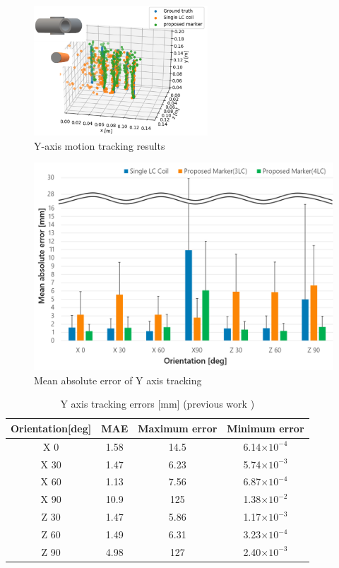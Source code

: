 \documentclass[journal,twoside,web]{ieeecolor}
\begin{document}
\begin{figure}[t]
\begin{minipage}{0.5\hsize}
\begin{center}
   \centerline{\includegraphics[width=65mm]{figure/yaxis-z90_2.png}}
  \end{center}
 \end{minipage}
 \caption{Y-axis motion tracking results}
 \label{y-axis-tracking}
\end{figure}
 
 \begin{figure}[t]
    \centerline{\includegraphics[width=\columnwidth]{figure/yaxis_error2.png}}
    \caption{Mean absolute error of Y axis tracking}
    \label{y-axis-ave_error}
\end{figure}

 \begin{table}[t]
  \begin{center}
  \caption{Y axis tracking errors [mm] (previous work \cite{im3d+})}
  \label{y-axis-error_1LC}
  \begin{tabular}{c||c|c|c} \hline
    Orientation[deg] & MAE & Maximum error & Minimum error\\ \hline\hline
    X 0 & 1.58 & 14.5 & 6.14$\times10^{-4}$ \\
    X 30 & 1.47 & 6.23 & 5.74$\times10^{-3}$ \\
    X 60 & 1.13 & 7.56 & 6.87$\times10^{-4}$ \\
    X 90 & 10.9 & 125 & 1.38$\times10^{-2}$  \\
    Z 30 & 1.47 & 5.86 & 1.17$\times10^{-3}$ \\
    Z 60 & 1.49 & 6.31 & 3.23$\times10^{-4}$ \\
    Z 90 & 4.98 & 127 & 2.40$\times10^{-3}$ \\
  \end{tabular}
  \end{center}
\end{table}
\end{document}
